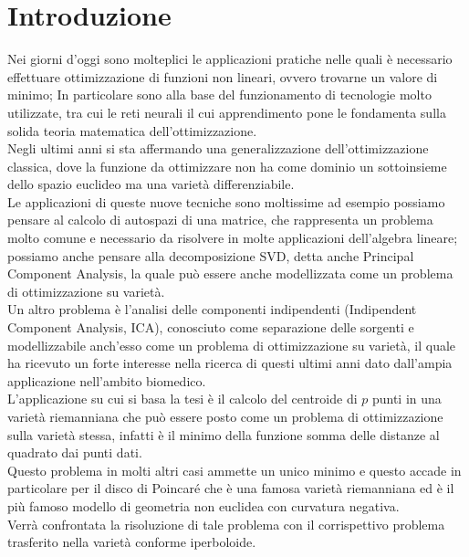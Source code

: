 \documentclass[a4paper, 12pt]{article}
\begin{document}
\newpage

\renewcommand{\contentsname}{Contenuti}
\tableofcontents

\newpage

\section{Introduzione}
Nei giorni d'oggi sono molteplici le applicazioni pratiche nelle quali è necessario effettuare ottimizzazione di funzioni non lineari, ovvero trovarne un valore di minimo; In particolare sono alla base del funzionamento di tecnologie molto utilizzate, tra cui le reti neurali il cui apprendimento pone le fondamenta sulla solida teoria matematica dell'ottimizzazione.\\
Negli ultimi anni si sta affermando una generalizzazione dell'ottimizzazione classica, dove la funzione da ottimizzare non ha come dominio un sottoinsieme dello spazio euclideo ma una varietà differenziabile.\\
Le applicazioni di queste nuove tecniche sono moltissime ad esempio possiamo pensare al calcolo di autospazi di una matrice, che rappresenta un problema molto comune e necessario da risolvere in molte applicazioni dell'algebra lineare; possiamo anche pensare alla decomposizione SVD, detta anche Principal Component Analysis, la quale può essere anche modellizzata come un problema di ottimizzazione su varietà.\\
Un altro problema è l'analisi delle componenti indipendenti (Indipendent Component Analysis, ICA), conosciuto come separazione delle sorgenti e modellizzabile anch'esso come un problema di ottimizzazione su varietà, il quale ha ricevuto un forte interesse nella ricerca di questi ultimi anni dato dall'ampia applicazione nell'ambito biomedico.\\
L'applicazione su cui si basa la tesi è il calcolo del centroide di $p$ punti in una varietà riemanniana che può essere posto come un problema di ottimizzazione sulla varietà stessa, infatti è il minimo della funzione somma delle distanze al quadrato dai punti dati.\\
Questo problema in molti altri casi ammette un unico minimo e questo accade in particolare per il disco di Poincaré che è una famosa varietà riemanniana ed è il più famoso modello di geometria non euclidea con curvatura negativa.\\
Verrà confrontata la risoluzione di tale problema con il corrispettivo problema trasferito nella varietà conforme iperboloide.\\
\end{document}
